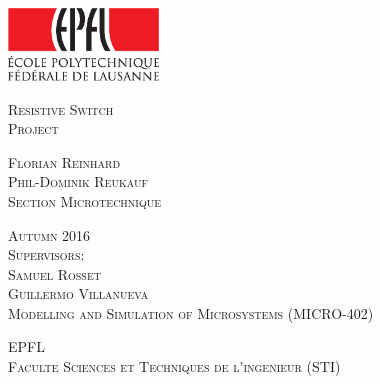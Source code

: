 


\newcommand{\Ptype}{Project} %
\newcommand{\Ptitle}{Resistive Switch}
\newcommand{\Pcand}{Florian Reinhard \\ Phil-Dominik Reukauf}
\newcommand{\Psect}{Section Microtechnique}
\newcommand{\Pfirst}{Samuel Rosset}
\newcommand{\Psecond}{Guillermo Villanueva}
\newcommand{\Pseason}{Autumn 2016} %



\begin{titlepage}

\begin{center}


\includegraphics[width=4cm]{logo_epfl_coul.eps}

\vspace*{1cm}
\Huge
\textsc{\Ptitle}\\
\vspace{0.5cm}
\vspace{0.5cm}
\normalsize
\textsc{\Ptype }\\ %
\vspace{1cm}

\large
\textsc{\Pcand\\[0.5\baselineskip] }
\normalsize
\textsc{\Psect}\\
\vspace{0.6cm}

\textsc{\Pseason}\\ %
\vspace{0.6cm}
\textsc{Supervisors:\\ \Pfirst\\ \Psecond}\\
\vspace{0.6cm}
\textsc{Modelling and Simulation of Microsystems (MICRO-402)}


\vspace{0.6cm}
\textsc{EPFL\\
Faculte Sciences et Techniques de l'ingenieur (STI)}\\

\end{center}

\end{titlepage}
